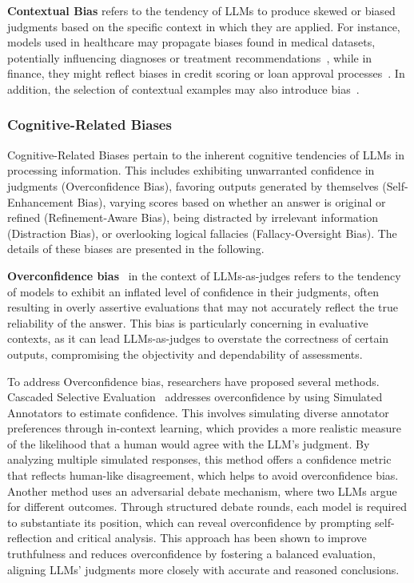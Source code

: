 \noindent\textbf{Contextual Bias} refers to the tendency of LLMs to produce skewed or biased judgments based on the specific context in which they are applied. For instance, models used in healthcare may propagate biases found in medical datasets, potentially influencing diagnoses or treatment recommendations~\cite{poulain2024bias}, while in finance, they might reflect biases in credit scoring or loan approval processes~\cite{zhou2024large}. 
In addition, the selection of contextual examples may also introduce bias~\cite{zhou2023batch,fei2023mitigating,zhao2021calibrate,han2022prototypical}.




\subsubsection{Cognitive-Related Biases} 
\label{sec:cognitivebiases}
Cognitive-Related Biases pertain to the inherent cognitive tendencies of LLMs in processing information. This includes exhibiting unwarranted confidence in judgments (Overconfidence Bias), favoring outputs generated by themselves (Self-Enhancement Bias), varying scores based on whether an answer is original or refined (Refinement-Aware Bias), being distracted by irrelevant information (Distraction Bias), or overlooking logical fallacies (Fallacy-Oversight Bias). The details of these biases are presented in the following.


\noindent\textbf{Overconfidence bias}~\cite{khan2024debating,jung2024trust} in the context of LLMs-as-judges refers to the tendency of models to exhibit an inflated level of confidence in their judgments, often resulting in overly assertive evaluations that may not accurately reflect the true reliability of the answer. This bias is particularly concerning in evaluative contexts, as it can lead LLMs-as-judges to overstate the correctness of certain outputs, compromising the objectivity and dependability of assessments.

To address Overconfidence bias, researchers have proposed several methods.
Cascaded Selective Evaluation~\cite{jung2024trust} addresses overconfidence by using Simulated Annotators to estimate confidence. This involves simulating diverse annotator preferences through in-context learning, which provides a more realistic measure of the likelihood that a human would agree with the LLM’s judgment. By analyzing multiple simulated responses, this method offers a confidence metric that reflects human-like disagreement, which helps to avoid overconfidence bias. 
Another method uses an adversarial debate mechanism, where two LLMs argue for different outcomes. Through structured debate rounds, each model is required to substantiate its position, which can reveal overconfidence by prompting self-reflection and critical analysis. This approach has been shown to improve truthfulness and reduces overconfidence by fostering a balanced evaluation, aligning LLMs' judgments more closely with accurate and reasoned conclusions.

